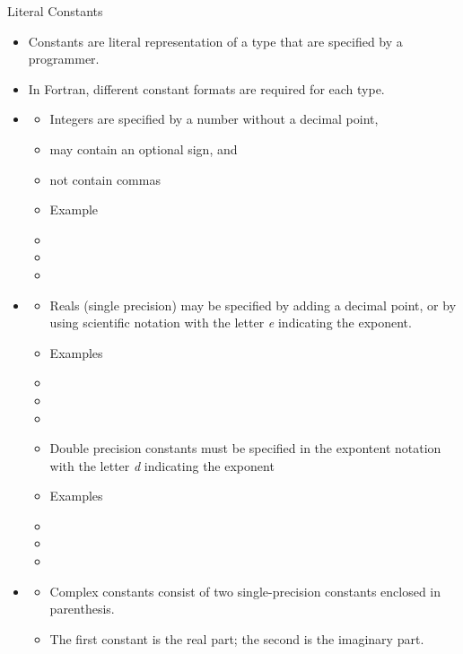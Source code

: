 \documentclass[10pt,t]{beamer}
\begin{document}
\begin{frame}[allowframebreaks]{Literal Constants}
  \begin{itemize}
    \item Constants are literal representation of a type that are specified by a programmer.
    \item In Fortran, different constant formats are required for each type.
    \item[] 
    \begin{itemize}
      \item Integers are specified by a number without a decimal point,
      \item may contain an optional sign, and
      \item not contain commas
      \item Example
      \item[] 
      \item[] 
      \item[] 
    \end{itemize}
    \framebreak
    \item[] 
    \begin{itemize}
      \item Reals (single precision) may be specified by adding a decimal point, or by using scientific notation with the letter {\em e} indicating the exponent.
      \item Examples
      \item[] 
      \item[] 
      \item[] 
      \item Double precision constants must be specified in the expontent notation with the letter {\em d} indicating the exponent
      \item Examples
      \item[] 
      \item[] 
      \item[] 
    \end{itemize}
    \framebreak
    \item[] 
    \begin{itemize}
      \item Complex constants consist of two single-precision constants enclosed in parenthesis.
      \item The first constant is the real part; the second is the imaginary part.

\end{itemize}
\end{itemize}
\end{frame}
\end{document}
